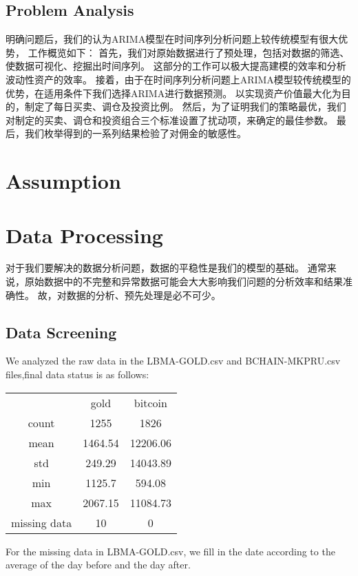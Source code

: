 \documentclass{mcmthesis}
\begin{document}
\subsection{Problem Analysis}

明确问题后，我们的认为ARIMA模型在时间序列分析问题上较传统模型有很大优势，
工作概览如下：
首先，我们对原始数据进行了预处理，包括对数据的筛选、使数据可视化、挖掘出时间序列。
这部分的工作可以极大提高建模的效率和分析波动性资产的效率。
接着，由于在时间序列分析问题上ARIMA模型较传统模型的优势，在适用条件下我们选择ARIMA进行数据预测。
以实现资产价值最大化为目的，制定了每日买卖、调仓及投资比例。
然后，为了证明我们的策略最优，我们对制定的买卖、调仓和投资组合三个标准设置了扰动项，来确定的最佳参数。
最后，我们枚举得到的一系列结果检验了对佣金的敏感性。



\section{Assumption}





\section{Data Processing}
对于我们要解决的数据分析问题，数据的平稳性是我们的模型的基础。
通常来说，原始数据中的不完整和异常数据可能会大大影响我们问题的分析效率和结果准确性。
故，对数据的分析、预先处理是必不可少。


\subsection{Data Screening}
We analyzed the raw data in the LBMA-GOLD.csv and BCHAIN-MKPRU.csv files,final data status is as follows:

\begin{table}[]
  \begin{tabular}{ccc}
               & gold    & bitcoin  \\
  count        & 1255    & 1826     \\
  mean         & 1464.54 & 12206.06 \\
  std          & 249.29  & 14043.89 \\
  min          & 1125.7  & 594.08   \\
  max          & 2067.15 & 11084.73 \\
  missing data & 10      & 0       
  \end{tabular}
  \end{table}
For the missing data in LBMA-GOLD.csv, we fill in the date according to the average of the day before and the day after.
\end{document}
